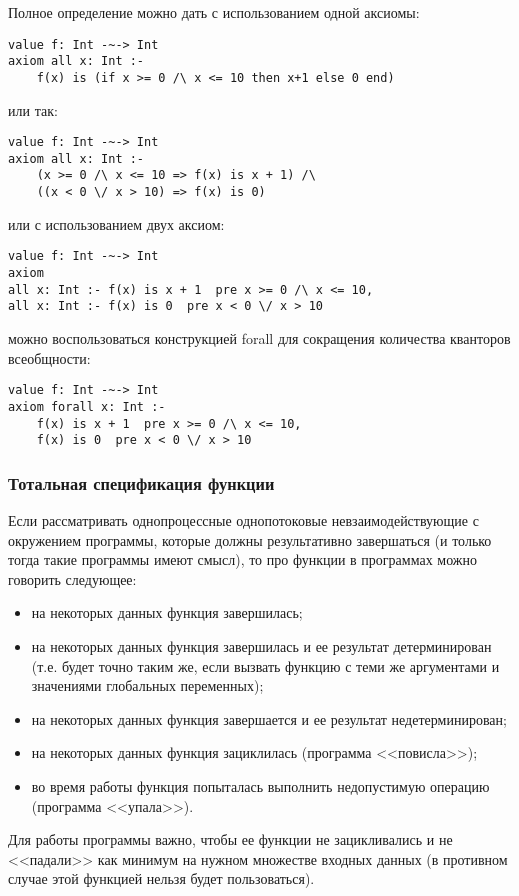 \documentclass[14pt, twoside]{extreport}
\newcommand{\head}[1]{\vspace{1cm}\subsubsection*{#1}}
\begin{document}
Полное определение можно дать с использованием одной аксиомы:
\begin{lstlisting}
value f: Int -~-> Int
axiom all x: Int :-
    f(x) is (if x >= 0 /\ x <= 10 then x+1 else 0 end)
\end{lstlisting}

или так:

\begin{lstlisting}
value f: Int -~-> Int
axiom all x: Int :-
    (x >= 0 /\ x <= 10 => f(x) is x + 1) /\
    ((x < 0 \/ x > 10) => f(x) is 0)
\end{lstlisting}

или с использованием двух аксиом:
\begin{lstlisting}
value f: Int -~-> Int
axiom
all x: Int :- f(x) is x + 1  pre x >= 0 /\ x <= 10,
all x: Int :- f(x) is 0  pre x < 0 \/ x > 10
\end{lstlisting}

можно воспользоваться конструкцией forall для сокращения количества кванторов всеобщности:
\begin{lstlisting}
value f: Int -~-> Int
axiom forall x: Int :-
    f(x) is x + 1  pre x >= 0 /\ x <= 10,
    f(x) is 0  pre x < 0 \/ x > 10
\end{lstlisting}

\head{Тотальная спецификация функции}

Если рассматривать однопроцессные однопотоковые невзаимодействующие с окружением программы, которые должны результативно завершаться (и только тогда такие программы имеют смысл), то про функции в программах можно говорить следующее:
\begin{itemize}
  \item на некоторых данных функция завершилась;
  \item на некоторых данных функция завершилась и ее результат детерминирован (т.е. будет точно таким же, если вызвать функцию с теми же аргументами и значениями глобальных переменных);
  \item на некоторых данных функция завершается и ее результат недетерминирован;
  \item на некоторых данных функция зациклилась (программа <<повисла>>);
  \item во время работы функция попыталась выполнить недопустимую операцию (программа <<упала>>).
\end{itemize}

Для работы программы важно, чтобы ее функции не зацикливались и не <<падали>> как минимум на нужном множестве входных данных (в противном случае этой функцией нельзя будет пользоваться).
\end{document}
